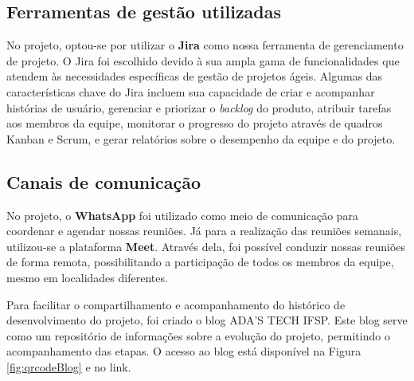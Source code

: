 \subsection{Ferramentas de gestão utilizadas}

No projeto, optou-se por utilizar o \textbf{Jira} como nossa ferramenta de gerenciamento de projeto. O Jira foi escolhido devido à sua ampla gama de funcionalidades que atendem às necessidades específicas de gestão de projetos ágeis. Algumas das características chave do Jira incluem sua capacidade de criar e acompanhar histórias de usuário, gerenciar e priorizar o \textit{backlog} do produto, atribuir tarefas aos membros da equipe, monitorar o progresso do projeto através de quadros Kanban e Scrum, e gerar relatórios sobre o desempenho da equipe e do projeto.

\subsection{Canais de comunicação}

No projeto, o \textbf{WhatsApp} foi utilizado como meio de comunicação para coordenar e agendar nossas reuniões. Já para a realização das reuniões semanais, utilizou-se a plataforma \textbf{Meet}. Através dela, foi possível conduzir nossas reuniões de forma remota, possibilitando a participação de todos os membros da equipe, mesmo em localidades diferentes.

Para facilitar o compartilhamento e acompanhamento do histórico de desenvolvimento do projeto, foi criado o blog ADA'S TECH IFSP. Este blog serve como um repositório de informações sobre a evolução do projeto, permitindo o acompanhamento das etapas. O acesso ao blog está disponível na Figura \ref{fig:qrcodeBlog} e no link.



